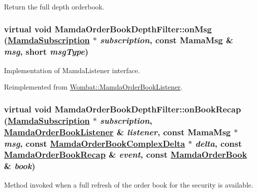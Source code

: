 Return the full depth orderbook. 

\hypertarget{classMamdaOrderBookDepthFilter_0d514d92284c0fefa84201aae411111d}{
\subsubsection[onMsg]{\setlength{\rightskip}{0pt plus 5cm}virtual void Mamda\-Order\-Book\-Depth\-Filter::on\-Msg (\hyperlink{classWombat_1_1MamdaSubscription}{Mamda\-Subscription} $\ast$ {\em subscription}, const Mama\-Msg \& {\em msg}, short {\em msg\-Type})}}
\label{classMamdaOrderBookDepthFilter_0d514d92284c0fefa84201aae411111d}


Implementation of Mamda\-Listener interface. 



Reimplemented from \hyperlink{classWombat_1_1MamdaOrderBookListener_25b4001c57c2a140040baad9f84bbec4}{Wombat::Mamda\-Order\-Book\-Listener}.\hypertarget{classMamdaOrderBookDepthFilter_5d9d813f0c49a0afe232d333a46236c8}{
\subsubsection[onBookRecap]{\setlength{\rightskip}{0pt plus 5cm}virtual void Mamda\-Order\-Book\-Depth\-Filter::on\-Book\-Recap (\hyperlink{classWombat_1_1MamdaSubscription}{Mamda\-Subscription} $\ast$ {\em subscription}, \hyperlink{classWombat_1_1MamdaOrderBookListener}{Mamda\-Order\-Book\-Listener} \& {\em listener}, const Mama\-Msg $\ast$ {\em msg}, const \hyperlink{classWombat_1_1MamdaOrderBookComplexDelta}{Mamda\-Order\-Book\-Complex\-Delta} $\ast$ {\em delta}, const \hyperlink{classWombat_1_1MamdaOrderBookRecap}{Mamda\-Order\-Book\-Recap} \& {\em event}, const \hyperlink{classWombat_1_1MamdaOrderBook}{Mamda\-Order\-Book} \& {\em book})}}
\label{classMamdaOrderBookDepthFilter_5d9d813f0c49a0afe232d333a46236c8}


Method invoked when a full refresh of the order book for the security is available. 

